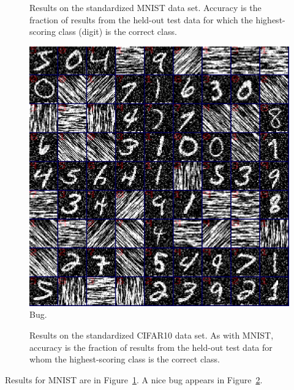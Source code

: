 \documentclass[twocolumn]{article}
\begin{document}
\begin{figure}[tp]
  \begin{center}
    
  \end{center}
  \caption{
    Results on the standardized MNIST data set. Accuracy is the
    fraction of results from the held-out test data for which the
    highest-scoring class (digit) is the correct class.
  } \label{fig:mnistresults}
\end{figure}

\begin{figure}[tp]
  \begin{center}
    \includegraphics[width=0.9 \linewidth]{mnist-bug}
  \end{center}
  \caption{
    Bug.
  } \label{fig:mnistbug}
\end{figure}

\begin{figure}[tp]
  \begin{center}
    
  \end{center}
  \caption{
    Results on the standardized CIFAR10 data set. As with MNIST,
    accuracy is the fraction of results from the held-out test
    data for whom the highest-scoring class is the correct class.
  } \label{fig:cifar10results}
\end{figure}

Results for MNIST are in Figure~\ref{fig:mnistresults}.
A nice bug appears in Figure~\ref{fig:mnistbug}.
\end{document}
